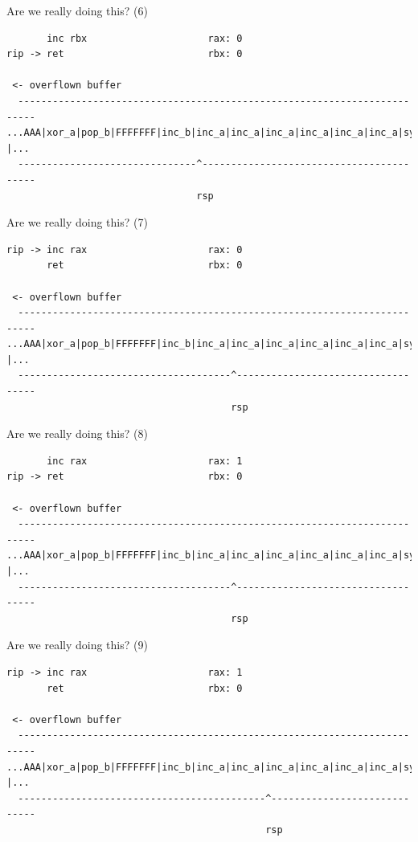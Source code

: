 \documentclass[9pt,aspectratio=169]{beamer}
\begin{document}
\begin{frame}[label={sec:orgb761cbc},fragile]{Are we really doing this? (6)}
 \begin{verbatim}
       inc rbx                     rax: 0
rip -> ret                         rbx: 0

 <- overflown buffer 
  -------------------------------------------------------------------------
...AAA|xor_a|pop_b|FFFFFFF|inc_b|inc_a|inc_a|inc_a|inc_a|inc_a|inc_a|sys |...
  -------------------------------^-----------------------------------------
                                 rsp
\end{verbatim}
\end{frame}
\begin{frame}[label={sec:org3e86fbb},fragile]{Are we really doing this? (7)}
 \begin{verbatim}
rip -> inc rax                     rax: 0
       ret                         rbx: 0

 <- overflown buffer 
  -------------------------------------------------------------------------
...AAA|xor_a|pop_b|FFFFFFF|inc_b|inc_a|inc_a|inc_a|inc_a|inc_a|inc_a|sys |...
  -------------------------------------^-----------------------------------
                                       rsp
\end{verbatim}
\end{frame}
\begin{frame}[label={sec:org31b35ca},fragile]{Are we really doing this? (8)}
 \begin{verbatim}
       inc rax                     rax: 1
rip -> ret                         rbx: 0

 <- overflown buffer 
  -------------------------------------------------------------------------
...AAA|xor_a|pop_b|FFFFFFF|inc_b|inc_a|inc_a|inc_a|inc_a|inc_a|inc_a|sys |...
  -------------------------------------^-----------------------------------
                                       rsp
\end{verbatim}
\end{frame}
\begin{frame}[label={sec:orgff58042},fragile]{Are we really doing this? (9)}
 \begin{verbatim}
rip -> inc rax                     rax: 1
       ret                         rbx: 0

 <- overflown buffer 
  -------------------------------------------------------------------------
...AAA|xor_a|pop_b|FFFFFFF|inc_b|inc_a|inc_a|inc_a|inc_a|inc_a|inc_a|sys |...
  -------------------------------------------^-----------------------------
                                             rsp
\end{verbatim}
\end{frame}
\end{document}
